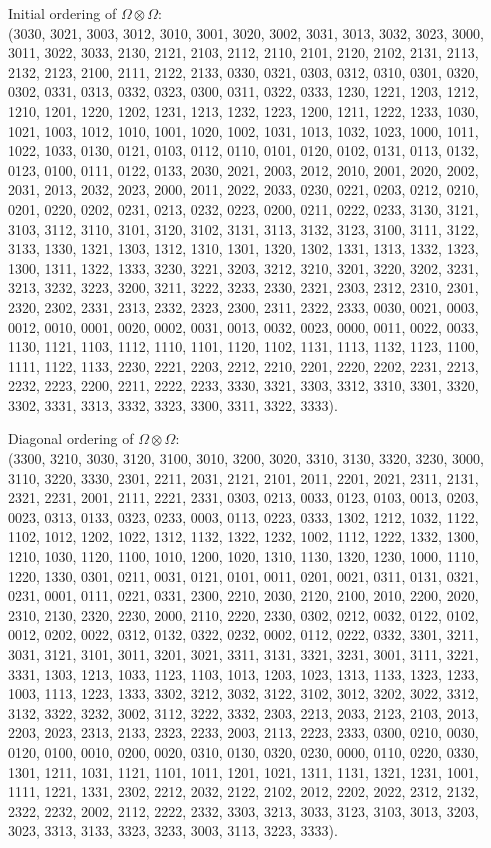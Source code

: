 \documentclass[pdftex]{sigma}
\numberwithin{equation}{section}
\theoremstyle{definition}
\begin{document}
Initial ordering of $\Omega \otimes \Omega$:\\
(3030, 3021, 3003, 3012, 3010, 3001, 3020, 3002, 3031, 3013, 3032, 3023, 3000, 3011, 3022, 3033, 2130, 2121, 2103, 2112, 2110, 2101, 2120, 2102, 2131, 2113, 2132, 2123, 2100, 2111, 2122, 2133, 0330, 0321, 0303, 0312, 0310, 0301, 0320, 0302, 0331, 0313, 0332, 0323, 0300, 0311, 0322, 0333, 1230, 1221, 1203, 1212, 1210, 1201, 1220, 1202, 1231, 1213, 1232, 1223, 1200, 1211, 1222, 1233, 1030, 1021, 1003, 1012, 1010, 1001, 1020, 1002, 1031, 1013, 1032, 1023, 1000, 1011, 1022, 1033, 0130, 0121, 0103, 0112, 0110, 0101, 0120, 0102, 0131, 0113, 0132, 0123, 0100, 0111, 0122, 0133, 2030, 2021, 2003, 2012, 2010, 2001, 2020, 2002, 2031, 2013, 2032, 2023, 2000, 2011, 2022, 2033, 0230, 0221, 0203, 0212, 0210, 0201, 0220, 0202, 0231, 0213, 0232, 0223, 0200, 0211, 0222, 0233, 3130, 3121, 3103, 3112, 3110, 3101, 3120, 3102, 3131, 3113, 3132, 3123, 3100, 3111, 3122, 3133, 1330, 1321, 1303, 1312, 1310, 1301, 1320, 1302, 1331, 1313, 1332, 1323, 1300, 1311, 1322, 1333, 3230, 3221, 3203, 3212, 3210, 3201, 3220, 3202, 3231, 3213, 3232, 3223, 3200, 3211, 3222, 3233, 2330, 2321, 2303, 2312, 2310, 2301, 2320, 2302, 2331, 2313, 2332, 2323, 2300, 2311, 2322, 2333, 0030, 0021, 0003, 0012, 0010, 0001, 0020, 0002, 0031, 0013, 0032, 0023, 0000, 0011, 0022, 0033, 1130, 1121, 1103, 1112, 1110, 1101, 1120, 1102, 1131, 1113, 1132, 1123, 1100, 1111, 1122, 1133, 2230, 2221, 2203, 2212, 2210, 2201, 2220, 2202, 2231, 2213, 2232, 2223, 2200, 2211, 2222, 2233, 3330, 3321, 3303, 3312, 3310, 3301, 3320, 3302, 3331, 3313, 3332, 3323, 3300, 3311, 3322, 3333).

Diagonal ordering of $\Omega \otimes \Omega$:\\
(3300, 3210, 3030, 3120, 3100, 3010, 3200, 3020, 3310, 3130, 3320, 3230, 3000, 3110, 3220, 3330, 2301, 2211, 2031, 2121, 2101, 2011, 2201, 2021, 2311, 2131, 2321, 2231, 2001, 2111, 2221, 2331, 0303, 0213, 0033, 0123, 0103, 0013, 0203, 0023, 0313, 0133, 0323, 0233, 0003, 0113, 0223, 0333, 1302, 1212, 1032, 1122, 1102, 1012, 1202, 1022, 1312, 1132, 1322, 1232, 1002, 1112, 1222, 1332, 1300, 1210, 1030, 1120, 1100, 1010, 1200, 1020, 1310, 1130, 1320, 1230, 1000, 1110, 1220, 1330, 0301, 0211, 0031, 0121, 0101, 0011, 0201, 0021, 0311, 0131, 0321, 0231, 0001, 0111, 0221, 0331, 2300, 2210, 2030, 2120, 2100, 2010, 2200, 2020, 2310, 2130, 2320, 2230, 2000, 2110, 2220, 2330, 0302, 0212, 0032, 0122, 0102, 0012, 0202, 0022, 0312, 0132, 0322, 0232, 0002, 0112, 0222, 0332, 3301, 3211, 3031, 3121, 3101, 3011, 3201, 3021, 3311, 3131, 3321, 3231, 3001, 3111, 3221, 3331, 1303, 1213, 1033, 1123, 1103, 1013, 1203, 1023, 1313, 1133, 1323, 1233, 1003, 1113, 1223, 1333, 3302, 3212, 3032, 3122, 3102, 3012, 3202, 3022, 3312, 3132, 3322, 3232, 3002, 3112, 3222, 3332, 2303, 2213, 2033, 2123, 2103, 2013, 2203, 2023, 2313, 2133, 2323, 2233, 2003, 2113, 2223, 2333, 0300, 0210, 0030, 0120, 0100, 0010, 0200, 0020, 0310, 0130, 0320, 0230, 0000, 0110, 0220, 0330, 1301, 1211, 1031, 1121, 1101, 1011, 1201, 1021, 1311, 1131, 1321, 1231, 1001, 1111, 1221, 1331, 2302, 2212, 2032, 2122, 2102, 2012, 2202, 2022, 2312, 2132, 2322, 2232, 2002, 2112, 2222, 2332, 3303, 3213, 3033, 3123, 3103, 3013, 3203, 3023, 3313, 3133, 3323, 3233, 3003, 3113, 3223, 3333).
\end{document}
